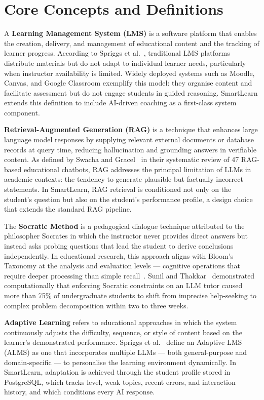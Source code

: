 \documentclass[12pt,a4paper]{report}
\begin{document}
\section{Core Concepts and Definitions}

A \textbf{Learning Management System (LMS)} is a software platform that enables the
creation, delivery, and management of educational content and the tracking of learner
progress. According to Spriggs et al.~\cite{ref2}, traditional LMS platforms
distribute materials but do not adapt to individual learner needs, particularly when
instructor availability is limited. Widely deployed systems such as Moodle, Canvas,
and Google Classroom exemplify this model: they organise content and facilitate
assessment but do not engage students in guided reasoning. SmartLearn extends this
definition to include AI-driven coaching as a first-class system component.

\textbf{Retrieval-Augmented Generation (RAG)} is a technique that enhances large
language model responses by supplying relevant external documents or database records
at query time, reducing hallucination and grounding answers in verifiable content. As
defined by Swacha and Gracel~\cite{ref12} in their systematic review of 47 RAG-based
educational chatbots, RAG addresses the principal limitation of LLMs in academic
contexts: the tendency to generate plausible but factually incorrect statements. In
SmartLearn, RAG retrieval is conditioned not only on the student's question but also
on the student's performance profile, a design choice that extends the standard RAG
pipeline.

The \textbf{Socratic Method} is a pedagogical dialogue technique attributed to the
philosopher Socrates in which the instructor never provides direct answers but instead
asks probing questions that lead the student to derive conclusions independently. In
educational research, this approach aligns with Bloom's Taxonomy at the analysis and
evaluation levels --- cognitive operations that require deeper processing than simple
recall~\cite{ref5}. Sunil and Thakkar~\cite{ref5} demonstrated computationally that
enforcing Socratic constraints on an LLM tutor caused more than 75\% of undergraduate
students to shift from imprecise help-seeking to complex problem decomposition within
two to three weeks.

\textbf{Adaptive Learning} refers to educational approaches in which the system
continuously adjusts the difficulty, sequence, or style of content based on the
learner's demonstrated performance. Spriggs et al.~\cite{ref2} define an Adaptive LMS
(ALMS) as one that incorporates multiple LLMs --- both general-purpose and
domain-specific --- to personalise the learning environment dynamically. In
SmartLearn, adaptation is achieved through the student profile stored in PostgreSQL,
which tracks level, weak topics, recent errors, and interaction history, and which
conditions every AI response.
\end{document}
